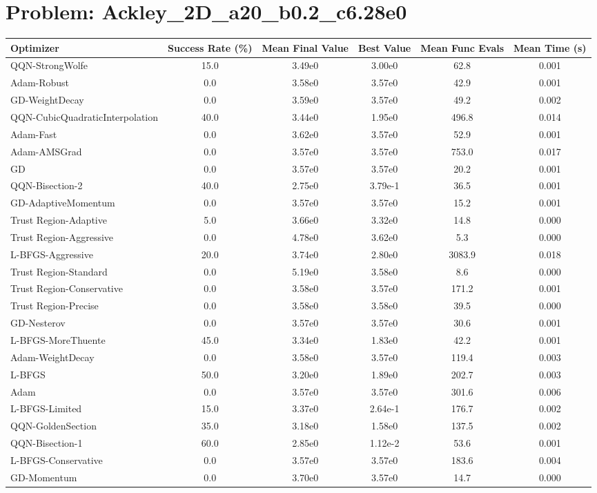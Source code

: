 \documentclass{article}
\begin{document}
\section{Problem: Ackley\_2D\_a20\_b0.2\_c6.28e0}
\begin{longtable}{p{3cm}*{5}{c}}
\toprule
\textbf{Optimizer} & \textbf{Success Rate (\%)} & \textbf{Mean Final Value} & \textbf{Best Value} & \textbf{Mean Func Evals} & \textbf{Mean Time (s)} \\
\midrule
QQN-StrongWolfe & 15.0 & 3.49e0 & 3.00e0 & 62.8 & 0.001 \\
Adam-Robust & 0.0 & 3.58e0 & 3.57e0 & 42.9 & 0.001 \\
GD-WeightDecay & 0.0 & 3.59e0 & 3.57e0 & 49.2 & 0.002 \\
QQN-CubicQuadraticInterpolation & 40.0 & 3.44e0 & 1.95e0 & 496.8 & 0.014 \\
Adam-Fast & 0.0 & 3.62e0 & 3.57e0 & 52.9 & 0.001 \\
Adam-AMSGrad & 0.0 & 3.57e0 & 3.57e0 & 753.0 & 0.017 \\
GD & 0.0 & 3.57e0 & 3.57e0 & 20.2 & 0.001 \\
QQN-Bisection-2 & 40.0 & 2.75e0 & 3.79e-1 & 36.5 & 0.001 \\
GD-AdaptiveMomentum & 0.0 & 3.57e0 & 3.57e0 & 15.2 & 0.001 \\
Trust Region-Adaptive & 5.0 & 3.66e0 & 3.32e0 & 14.8 & 0.000 \\
Trust Region-Aggressive & 0.0 & 4.78e0 & 3.62e0 & 5.3 & 0.000 \\
L-BFGS-Aggressive & 20.0 & 3.74e0 & 2.80e0 & 3083.9 & 0.018 \\
Trust Region-Standard & 0.0 & 5.19e0 & 3.58e0 & 8.6 & 0.000 \\
Trust Region-Conservative & 0.0 & 3.58e0 & 3.57e0 & 171.2 & 0.001 \\
Trust Region-Precise & 0.0 & 3.58e0 & 3.58e0 & 39.5 & 0.000 \\
GD-Nesterov & 0.0 & 3.57e0 & 3.57e0 & 30.6 & 0.001 \\
L-BFGS-MoreThuente & 45.0 & 3.34e0 & 1.83e0 & 42.2 & 0.001 \\
Adam-WeightDecay & 0.0 & 3.58e0 & 3.57e0 & 119.4 & 0.003 \\
L-BFGS & 50.0 & 3.20e0 & 1.89e0 & 202.7 & 0.003 \\
Adam & 0.0 & 3.57e0 & 3.57e0 & 301.6 & 0.006 \\
L-BFGS-Limited & 15.0 & 3.37e0 & 2.64e-1 & 176.7 & 0.002 \\
QQN-GoldenSection & 35.0 & 3.18e0 & 1.58e0 & 137.5 & 0.002 \\
QQN-Bisection-1 & 60.0 & 2.85e0 & 1.12e-2 & 53.6 & 0.001 \\
L-BFGS-Conservative & 0.0 & 3.57e0 & 3.57e0 & 183.6 & 0.004 \\
GD-Momentum & 0.0 & 3.70e0 & 3.57e0 & 14.7 & 0.000 \\
\bottomrule
\end{longtable}
\end{document}
